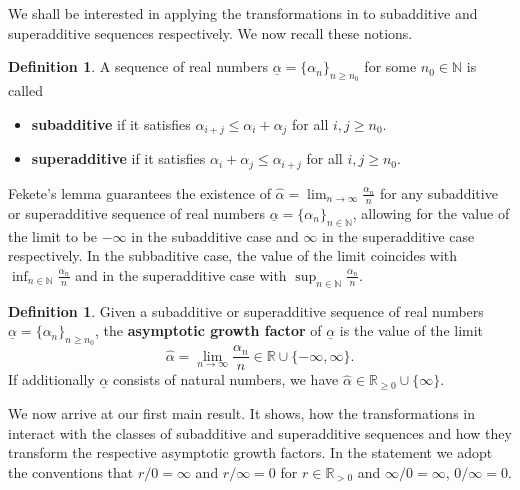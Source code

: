 \documentclass[12pt, reqno]{amsart}
\numberwithin{equation}{section}
\def\a{\ensuremath{\alpha}}
\def\ua{\ensuremath{\underline{\alpha}}}
\def\b{\ensuremath{\beta}}
\def\ub{\ensuremath{\underline{\beta}}}
\newcommand{\wa}{\widehat{\alpha}}
\newcommand{\N}{{\mathbb N}}
\newcommand{\R}{{\mathbb R}}
\theoremstyle{plain} %
\theoremstyle{definition}
\newtheorem{defn}[thm]{Definition}
\theoremstyle{remark}
\newcommand{\uao}{\overleftarrow{\ua}}
\newcommand{\uau}{\overrightarrow{\ua}}
\begin{document}
We shall be interested in applying the transformations in  to subadditive and superadditive sequences respectively. We now recall these notions.

\begin{defn}
\label{def:subsuper}
A sequence of real  numbers $\ua=\{\alpha_n\}_{n\geq n_0}$ for some $n_0\in\N$ is called 
\begin{itemize}
\item {\bf subadditive} if it satisfies $\alpha_{i+j} \leq \alpha_i+\alpha_j$ for all $i,j\geq n_0$.
\item {\bf superadditive} if it satisfies $\alpha_i+\alpha_j\leq \alpha_{i+j}$ for all $i,j\geq n_0$.
\end{itemize}
\end{defn}

 Fekete's lemma \cite{Fekete} guarantees the existence of  $\wa=\lim_{n\to\infty} \frac{\a_n}{n}$ for any subadditive  or superadditive sequence of real numbers $\ua=\{\a_n\}_{n\in \N}$, allowing for the value of the limit to be $-\infty$ in the subadditive case and $\infty$ in the superadditive case respectively.  In the subbaditive case, the value of the limit coincides with $\inf_{n\in \N} \frac{\a_n}{n}$ and in the superadditive case with $\sup_{n\in \N} \frac{\a_n}{n}$. %
 
 \begin{defn}
 Given a subadditive  or superadditive sequence of real numbers $\ua=\{\a_n\}_{n\geq n_0}$,  the {\bf asymptotic growth factor} 
 of $\ua$ is the value of the limit 
 \[
 \wa=\lim_{n\to\infty} \frac{\a_n}{n}\in \R\cup\{-\infty, \infty\}.
 \]
 If additionally $\ua$ consists of natural numbers, we have  $\wa\in \R_{\geq 0} \cup\{ \infty\}$.  
 \end{defn}
 
 
 We now arrive at our first main result. It shows, how the transformations in  interact with the classes of subadditive and superadditive sequences and how they transform the respective asymptotic growth factors. In the statement we adopt the conventions that $r/0=\infty$ and $r/\infty=0$ for $r\in \R_{>0}$ and $\infty/0=\infty$, $0/\infty=0$.
 
\end{document}
